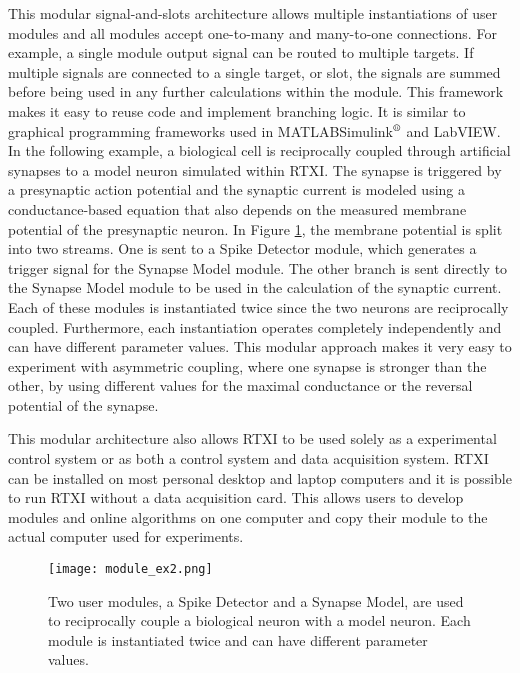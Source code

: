 This modular signal-and-slots architecture allows multiple instantiations of user modules and all modules accept one-to-many and many-to-one connections. For example, a single module output signal can be routed to multiple targets. If multiple signals are connected to a single target, or slot, the signals are summed before being used in any further calculations within the module. This framework makes it easy to reuse code and implement branching logic. It is similar to graphical programming frameworks used in MATLAB\tm Simulink$^{\textrm{\textregistered}}$ and LabVIEW\tm. In the following example, a biological cell is reciprocally coupled through artificial synapses to a model neuron simulated within RTXI. The synapse is triggered by a presynaptic action potential and the synaptic current is modeled using a conductance-based equation that also depends on the measured membrane potential of the presynaptic neuron. In Figure \ref{fig: Workflow 2}, the membrane potential is split into two streams. One is sent to a Spike Detector module, which generates a trigger signal for the Synapse Model module. The other branch is sent directly to the Synapse Model module to be used in the calculation of the synaptic current. Each of these modules is instantiated twice since the two neurons are reciprocally coupled. Furthermore, each instantiation operates completely independently and can have different parameter values. This modular approach makes it very easy to experiment with asymmetric coupling, where one synapse is stronger than the other, by using different values for the maximal conductance or the reversal potential of the synapse.

This modular architecture also allows RTXI to be used solely as a experimental control system or as both a control system and data acquisition system. RTXI can be installed on most personal desktop and laptop computers and it is possible to run RTXI without a data acquisition card. This allows users to develop modules and online algorithms on one computer and copy their module to the actual computer used for experiments.

\begin{figure}[h!]
\begin{maxipage}
\begin{center}
\texttt{[image: module\_ex2.png]} 
\caption[RTXI Workflow Example 2]{Two user modules, a Spike Detector and a Synapse Model, are used to reciprocally couple a biological neuron with a model neuron. Each module is instantiated twice and can have different parameter values.} 
\label{fig: Workflow 2}
\end{center}
\end{maxipage}
\end{figure}

